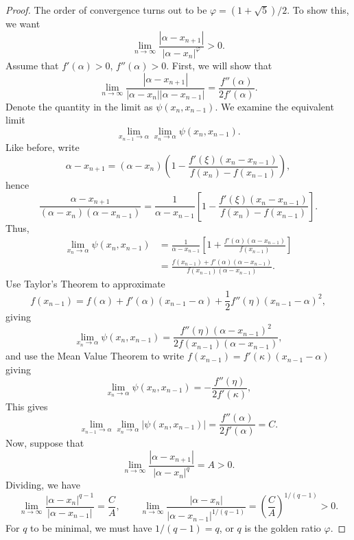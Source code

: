 \documentclass[11pt]{article}
\theoremstyle{definition}
\theoremstyle{remark}
\numberwithin{equation}{section}
\begin{document}
\begin{proof}
        The order of convergence turns out to be $\varphi = (1 + \sqrt{5}) / 2$. To
        show this, we want \[
            \lim_{n \to \infty} \frac{|\alpha - x_{n + 1}|}{|\alpha - x_n|^\varphi} >
            0.
        \] Assume that $f'(\alpha) > 0$, $f''(\alpha) > 0$. First, we will show that
        \[
            \lim_{n \to \infty} \frac{|\alpha - x_{n + 1}|}{|\alpha - x_n| |\alpha -
            x_{n - 1}|} = \frac{f''(\alpha)}{2f'(\alpha)}.
        \] Denote the quantity in the limit as $\psi(x_n, x_{n - 1})$. We examine the
        equivalent limit \[
            \lim_{x_{n - 1} \to \alpha} \lim_{x_n \to \alpha} \psi(x_n, x_{n - 1}).
        \] Like before, write \[
            \alpha - x_{n + 1} = (\alpha - x_n)\left(1 - \frac{f'(\xi)(x_n - x_{n -
            1})}{f(x_n) - f(x_{n - 1})}\right), 
        \] hence \[
            \frac{\alpha - x_{n + 1}}{(\alpha - x_n)(\alpha - x_{n - 1})} =
            \frac{1}{\alpha - x_{n - 1}} \left[1 - \frac{f'(\xi)(x_n - x_{n -
            1})}{f(x_n) - f(x_{n - 1})}\right].
        \] Thus, \begin{align*}
            \lim_{x_n \to \alpha} \psi(x_n, x_{n - 1}) &= \frac{1}{\alpha - x_{n -
            1}}\left[1 + \frac{f'(\alpha)(\alpha - x_{n - 1})}{f(x_{n - 1})}\right]
            \\
            &= \frac{f(x_{n - 1}) + f'(\alpha)(\alpha - x_{n - 1})}{f(x_{n -
            1})(\alpha - x_{n - 1})}.
        \end{align*}
        Use Taylor's Theorem to approximate \[
            f(x_{n - 1}) = f(\alpha) + f'(\alpha)(x_{n - 1} - \alpha) +
            \frac{1}{2}f''(\eta)(x_{n - 1} - \alpha)^2,
        \] giving \[
            \lim_{x_n \to \alpha} \psi(x_n, x_{n - 1}) =
            \frac{f''(\eta)(\alpha - x_{n - 1})^2}{2f(x_{n - 1})(\alpha - x_{n -
            1})},
        \] and use the Mean Value Theorem to write $f(x_{n - 1}) =
        f'(\kappa)(x_{n - 1} - \alpha)$ giving \[
            \lim_{x_n \to \alpha} \psi(x_n, x_{n - 1}) =
            -\frac{f''(\eta)}{2f'(\kappa)},
        \] This gives \[
            \lim_{x_{n - 1} \to \alpha}\lim_{x_n \to \alpha} |\psi(x_n, x_{n - 1})| =
            \frac{f''(\alpha)}{2f'(\alpha)} = C.
        \] Now, suppose that \[
            \lim_{n \to \infty} \frac{|\alpha - x_{n + 1}|}{|\alpha - x_n|^q} = A >
            0.
        \] Dividing, we have \[
            \lim_{n \to \infty} \frac{|\alpha - x_n|^{q - 1}}{|\alpha - x_{n - 1}|} =
            \frac{C}{A}, \qquad
            \lim_{n \to \infty} \frac{|\alpha - x_n|}{|\alpha - x_{n - 1}|^{1 / (q -
            1)}} = \left(\frac{C}{A}\right)^{1 / (q - 1)} > 0.
        \] For $q$ to be minimal, we must have $1 / (q - 1) = q$, or $q$ is the
        golden ratio
        $\varphi$.
    \end{proof}
\end{document}
